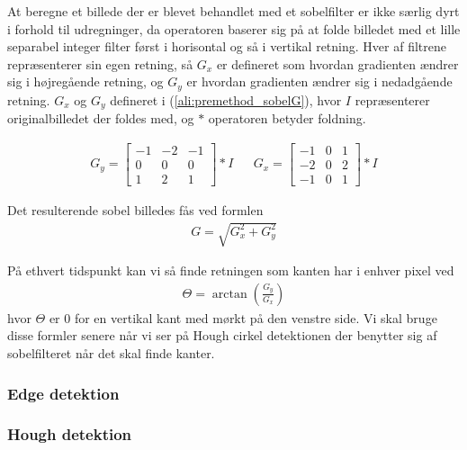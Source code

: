 At beregne et billede der er blevet behandlet med et sobelfilter er ikke særlig dyrt i forhold til udregninger, da operatoren baserer sig på at folde billedet med et lille separabel integer filter først i horisontal og så i vertikal retning. Hver af filtrene repræsenterer sin egen retning, så $G_x$ er defineret som hvordan gradienten ændrer sig i højregående retning, og $G_y$ er hvordan gradienten ændrer sig i nedadgående retning. $G_x$ og $G_y$ defineret i  (\ref{ali:premethod_sobelG}), hvor $I$ repræsenterer originalbilledet der foldes med, og $*$ operatoren betyder foldning.

\begin{align}
	G_y = \begin{bmatrix}
		-1 & -2 & -1\\
		0 & 0 & 0\\
		1 & 2 & 1
	\end{bmatrix} * I
	&&
	G_x = \begin{bmatrix}
		-1 & 0 & 1\\
		-2 & 0 & 2\\
		-1 & 0 & 1
	\end{bmatrix} * I
	\label{ali:premethod_sobelG}
\end{align} 

Det resulterende sobel billedes fås ved formlen 
\begin{align}
	G = \sqrt{G_x^2 + G_y^2}
\end{align}

På ethvert tidspunkt kan vi så finde retningen som kanten har i enhver pixel ved 
\begin{align}
	\Theta = \arctan\left(\frac{G_y}{G_x}\right)
\end{align}
hvor $\Theta$ er 0 for en vertikal kant med mørkt på den venstre side. Vi skal bruge disse formler senere når vi ser på Hough cirkel detektionen der benytter sig af sobelfilteret når det skal finde kanter. 


\subsubsection{Edge detektion}

\subsubsection{Hough detektion}\label{premethod_hough}

